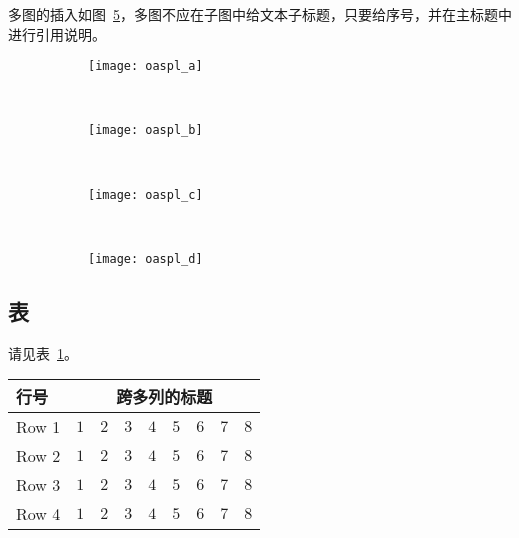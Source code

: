 多图的插入如图~\ref{fig:oaspl}，多图不应在子图中给文本子标题，只要给序号，并在主标题中进行引用说明。
\begin{figure}[htbp]
    \centering
    \begin{subfigure}[b]{0.35\textwidth}
      \texttt{[image: oaspl\_a]}
      \caption{}
      \label{fig:oaspl_a}
    \end{subfigure}%
    ~%
    \begin{subfigure}[b]{0.35\textwidth}
      \texttt{[image: oaspl\_b]}
      \caption{}
      \label{fig:oaspl_b}
    \end{subfigure}
    \\%
    \begin{subfigure}[b]{0.35\textwidth}
      \texttt{[image: oaspl\_c]}
      \caption{}
      \label{fig:oaspl_c}
    \end{subfigure}%
    ~%
    \begin{subfigure}[b]{0.35\textwidth}
      \texttt{[image: oaspl\_d]}
      \caption{}
      \label{fig:oaspl_d}
    \end{subfigure}
    \label{fig:oaspl}
\end{figure}

\subsection{表}

请见表~\ref{tab:sample}。
\begin{table}[htbp]
    \label{tab:sample}
    \centering
    \footnotesize%
    \setlength{\tabcolsep}{4pt}%
    \renewcommand{\arraystretch}{1.2}%
    \begin{tabular}{lcccccccc}
        \hline
        行号 & \multicolumn{8}{c}{跨多列的标题}\\
        \hline
        Row 1 & $1$ & $2$ & $3$ & $4$ & $5$ & $6$ & $7$ & $8$\\
        Row 2 & $1$ & $2$ & $3$ & $4$ & $5$ & $6$ & $7$ & $8$\\
        Row 3 & $1$ & $2$ & $3$ & $4$ & $5$ & $6$ & $7$ & $8$\\
        Row 4 & $1$ & $2$ & $3$ & $4$ & $5$ & $6$ & $7$ & $8$\\
        \hline
    \end{tabular}
\end{table}

